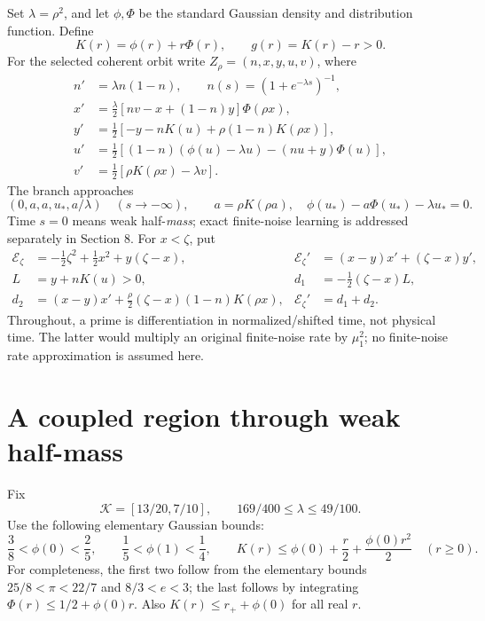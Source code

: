 \documentclass[11pt]{article}
\numberwithin{equation}{section}
\theoremstyle{remark}\newtheorem{remark}[theorem]{Remark}
\newcommand{\1}{\mathbf 1}
\begin{document}
Set $\lambda=\rho^2$, and let $\phi,\Phi$ be the standard Gaussian density
and distribution function. Define
\[
 K(r)=\phi(r)+r\Phi(r),\qquad g(r)=K(r)-r>0.
\]
For the selected coherent orbit write $Z_\rho=(n,x,y,u,v)$, where
\begin{align}
 n'&=\lambda n(1-n),\qquad n(s)=(1+e^{-\lambda s})^{-1},
 \label{inc:AN06:v1:orbit}\\
 x'&=\tfrac\lambda2[nv-x+(1-n)y]\Phi(\rho x),\nonumber\\
 y'&=\tfrac12[-y-nK(u)+\rho(1-n)K(\rho x)],\nonumber\\
 u'&=\tfrac12[(1-n)(\phi(u)-\lambda u)-(nu+y)\Phi(u)],\nonumber\\
 v'&=\tfrac12[\rho K(\rho x)-\lambda v].\nonumber
\end{align}
The branch approaches
\[
 (0,a,a,u_*,a/\lambda)\quad(s\to-\infty),\qquad
 a=\rho K(\rho a),\quad \phi(u_*)-a\Phi(u_*)-\lambda u_*=0.
\]
Time $s=0$ means weak half-\emph{mass}; exact finite-noise learning is
addressed separately in Section 8.
For $x<\zeta$, put
\begin{align}
 \mathcal E_\zeta&=-\tfrac12\zeta^2+\tfrac12x^2+y(\zeta-x),
 &\mathcal E_\zeta'&=(x-y)x'+(\zeta-x)y',
 \label{inc:AN06:v1:error}\\
 L&=y+nK(u)>0,
 &d_1&=-\tfrac12(\zeta-x)L,\nonumber\\
 d_2&=(x-y)x'+\tfrac\rho2(\zeta-x)(1-n)K(\rho x),
 &\mathcal E_\zeta'&=d_1+d_2.\nonumber
\end{align}
Throughout, a prime is differentiation in normalized/shifted time, not
physical time. The latter would multiply an original finite-noise rate by
$\mu_1^2$; no finite-noise rate approximation is assumed here.

\section{A coupled region through weak half-mass}
\label{inc:AN06:v1:halfregion}
Fix
\begin{equation}\label{inc:AN06:v1:rhointerval}
 \mathcal K=[13/20,7/10],\qquad
 169/400\le\lambda\le49/100.
\end{equation}
Use the following elementary Gaussian bounds:
\begin{equation}\label{inc:AN06:v1:gaussianbounds}
 \frac38<\phi(0)<\frac25,\qquad
 \frac15<\phi(1)<\frac14,\qquad
 K(r)\le\phi(0)+\frac r2+\frac{\phi(0)r^2}{2}\quad(r\ge0).
\end{equation}
For completeness, the first two follow from the elementary bounds
$25/8<\pi<22/7$ and $8/3<e<3$; the last follows by integrating
$\Phi(r)\le1/2+\phi(0)r$. Also $K(r)\le r_++\phi(0)$ for all real $r$.
\end{document}
